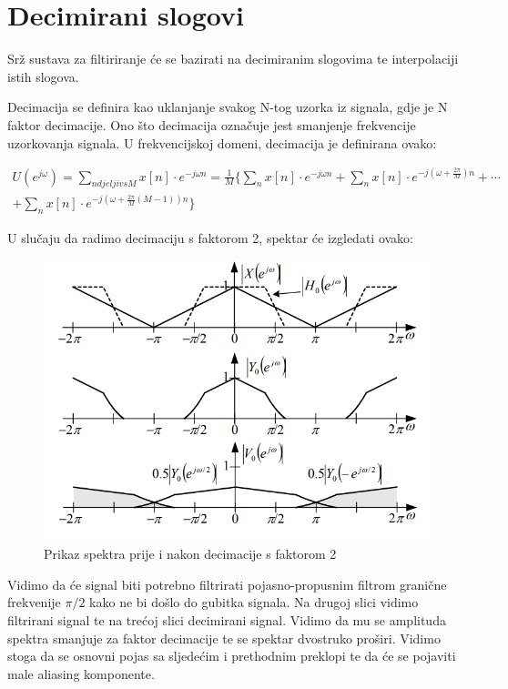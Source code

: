 \documentclass[times, utf8, diplomski]{fer}
\begin{document}
\section{Decimirani slogovi}
Srž sustava za filtiriranje će se bazirati na decimiranim slogovima te interpolaciji istih slogova.

Decimacija se definira kao uklanjanje svakog N-tog uzorka iz signala, gdje je N faktor decimacije. Ono što decimacija označuje jest smanjenje frekvencije uzorkovanja signala. U frekvencijskoj domeni, decimacija je definirana ovako:

\begin{equation}
\begin{aligned}
U(e^{j\omega}) = \sum_{n djeljiv s M}x[n]\cdot e^{-j\omega n} = \frac{1}{M}\{\sum_{n}x[n]\cdot e^{-j\omega n} + \sum_{n}x[n]\cdot e^{-j(\omega +\frac{2\pi}{M})n} + \cdots \\ + \sum_{n}x[n]\cdot e^{-j(\omega +\frac{2\pi}{M}(M-1))n}\}
\end{aligned}
\end{equation}

U slučaju da radimo decimaciju s faktorom 2, spektar će izgledati ovako:

\begin{figure}[hbt!]
 \centering
 \includegraphics[scale=0.6]{photos/decimacija.png}
 \caption{Prikaz spektra prije i nakon decimacije s faktorom 2}
 \label{dec}
\end{figure}
 Vidimo da će signal biti potrebno filtrirati pojasno-propusnim filtrom granične frekvenije $\pi/2$ kako ne bi došlo do gubitka signala. Na drugoj slici vidimo filtrirani signal te na trećoj slici decimirani signal. Vidimo da mu se amplituda spektra smanjuje za faktor decimacije te se spektar dvostruko proširi. Vidimo stoga da se osnovni pojas sa sljedećim i prethodnim preklopi te da će se pojaviti male aliasing komponente.
 
\end{document}
